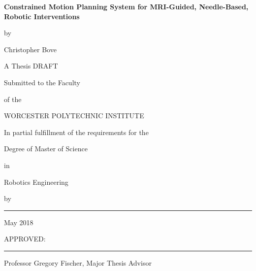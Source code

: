 \documentclass[12pt]{report}
\begin{document}
%


%
\newcommand{\brk}{\vspace*{0.18in}}

\thispagestyle{empty}

\begin{center}

\brk


   {\large 
	\textbf{
	Constrained Motion Planning System for MRI-Guided, Needle-Based, Robotic Interventions
	}
   }


\brk
by

\brk
Christopher Bove


\brk\brk
A Thesis DRAFT 

\brk
Submitted to the Faculty

\brk
of the 

\brk
WORCESTER POLYTECHNIC INSTITUTE
	
\brk
In partial fulfillment of the requirements for the

\brk
Degree of Master of Science

\brk
in

\brk
Robotics Engineering

\brk
by

\brk\brk
\rule{3in}{1.2pt}

\brk
May 2018

\end{center}

	
\vfill
APPROVED:

\vspace{0.25in}
\rule{3in}{0.8pt}

Professor Gregory Fischer, Major Thesis Advisor
\end{document}
